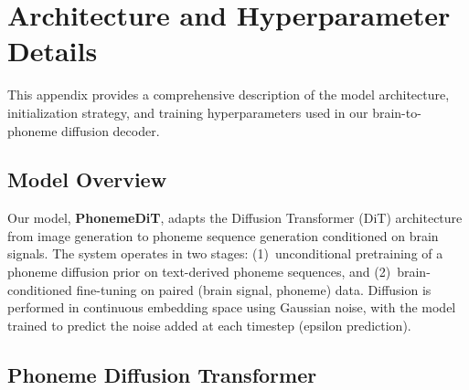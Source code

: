 \documentclass{article}
\begin{document}


\section{Architecture and Hyperparameter Details}
\label{appendix:architecture}
 
This appendix provides a comprehensive description of the model architecture, initialization strategy, and training hyperparameters used in our brain-to-phoneme diffusion decoder.
 
\subsection{Model Overview}
 
Our model, \textbf{PhonemeDiT}, adapts the Diffusion Transformer (DiT) architecture \cite{peebles2023dit} from image generation to phoneme sequence generation conditioned on brain signals. The system operates in two stages: (1)~unconditional pretraining of a phoneme diffusion prior on text-derived phoneme sequences, and (2)~brain-conditioned fine-tuning on paired (brain signal, phoneme) data. Diffusion is performed in continuous embedding space using Gaussian noise, with the model trained to predict the noise added at each timestep (epsilon prediction).
 
\subsection{Phoneme Diffusion Transformer}
 
\end{document}
